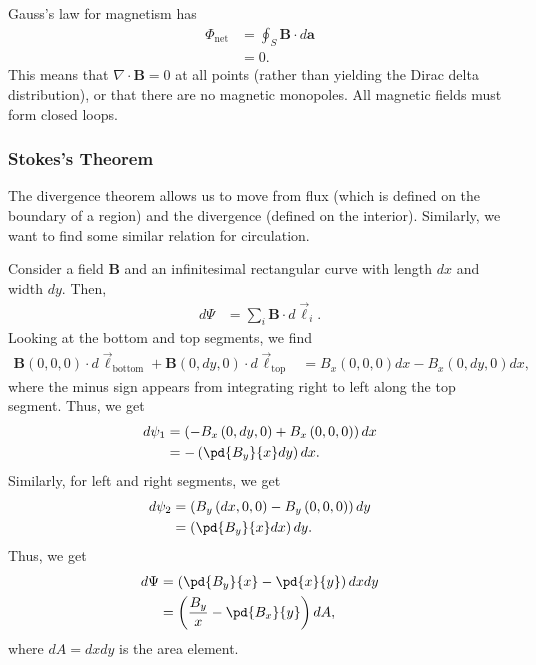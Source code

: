 \documentclass[10pt]{mypackage}
\begin{document}
\begin{remark}
  Gauss's law for magnetism has
  \begin{align*}
    \Phi_{\text{net}} &= \oint_{S}\mathbf{B}\cdot d\mathbf{a}\\
                      &= 0.
  \end{align*}
  This means that $\nabla \cdot \mathbf{B} = 0$ at all points (rather than yielding the Dirac delta distribution), or that there are no magnetic monopoles. All magnetic fields must form closed loops.
\end{remark}
\subsubsection{Stokes's Theorem}%
The divergence theorem allows us to move from flux (which is defined on the boundary of a region) and the divergence (defined on the interior). Similarly, we want to find some similar relation for circulation.\newline

Consider a field $\mathbf{B}$ and an infinitesimal rectangular curve with length $dx$ and width $dy$. Then,
\begin{align*}
  d\Psi &= \sum_{i}\mathbf{B}\cdot d\vec{\ell}_{i}.
\end{align*}
Looking at the bottom and top segments, we find
\begin{align*}
  \mathbf{B}\left(0,0,0\right)\cdot d\vec{\ell}_{\text{bottom}} + \mathbf{B}\left(0,dy,0\right)\cdot d\vec{\ell}_{\text{top}} &= B_x\left(0,0,0\right)dx - B_x\left(0,dy,0\right)dx,
\end{align*}
where the minus sign appears from integrating right to left along the top segment. Thus, we get
\begin{align*}
  d\psi_1 &= \left(-B_x\left(0,dy,0\right) + B_x\left(0,0,0\right)\right)dx\\
          &= -\left(\pd{B_y}{x}dy\right)dx.
\end{align*}
Similarly, for left and right segments, we get
\begin{align*}
  d\psi_2 &= \left(B_y\left(dx,0,0\right) - B_y\left(0,0,0\right)\right)dy\\
          &= \left(\pd{B_y}{x}dx\right)dy.
\end{align*}
Thus, we get
\begin{align*}
  d\Psi &= \left(\pd{B_y}{x} - \pd{x}{y}\right)dxdy\\
        &= \left(\frac{B_y}{x} - \pd{B_x}{y}\right)dA,
\end{align*}
where $dA = dx dy$ is the area element.\newline
\end{document}
